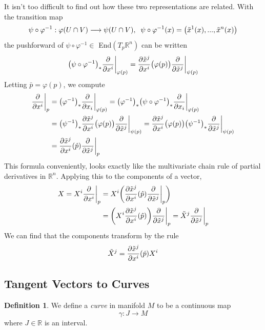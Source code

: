 \documentclass{article}
\theoremstyle{remark}
\theoremstyle{definition}
\newtheorem{definition}{Definition}[section]
\begin{document}
It isn't too difficult to find out how these two representations are related. With the transition map 
\[\psi \circ \varphi^{-1} : \varphi(U \cap V) \longrightarrow \psi (U \cap V), \;\; \psi \circ \varphi^{-1} (x) = \big( \Tilde{x}^1 (x), ..., \Tilde{x}^n (x) \big)\]
the pushforward of $\psi \circ \varphi^{-1} \in$ End$(T_p \mathbb{R}^n)$ can be written
\[\big( \psi \circ \varphi^{-1}\big)_* \frac{\partial}{\partial x^i} \bigg|_{\varphi(p)} = \frac{\partial \Tilde{x}^j}{\partial x^i} \big( \varphi(p) \big) \frac{\partial}{\partial \Tilde{x}^j} \bigg|_{\psi(p)}\]
Letting $\bar{p} = \varphi(p)$, we compute
\begin{align*}
    \frac{\partial}{\partial x^i} \bigg|_p & = \big( \varphi^{-1} \big)_* \frac{\partial}{\partial x_i} \bigg|_{\varphi(p)} = \big( \varphi^{-1} \big)_* \big( \psi \circ \varphi^{-1} \big)_* \frac{\partial}{\partial x_i} \bigg|_{\varphi(p)} \\ 
    & = \big( \psi^{-1}\big)_* \frac{\partial \Tilde{x}^j}{\partial x^i} \big( \varphi(p)\big) \frac{\partial}{\partial \Tilde{x}^j} \bigg|_{\psi(p)} = \frac{\partial \Tilde{x}^j}{\partial x^i} \big( \varphi(p)\big) \big( \psi^{-1}\big)_* \frac{\partial}{\partial \Tilde{x}^j} \bigg|_{\psi (p)} \\
    & = \frac{\partial \Tilde{x}^j}{\partial x^i} (\hat{p}) \frac{\partial}{\partial \Tilde{x}^j} \bigg|_p
\end{align*}
This formula conveniently, looks exactly like the multivariate chain rule of partial derivatives in $\mathbb{R}^n$. Applying this to the components of a vector, 
\begin{align*}
X = X^i \frac{\partial}{\partial x^i} \bigg|_p & = X^i \bigg( \frac{\partial \Tilde{x}^j}{\partial x^i} (\hat{p}) \frac{\partial}{\partial \Tilde{x}^j} \bigg|_p \bigg) \\
& = \bigg(X^i \frac{\partial \Tilde{x}^j}{\partial x^i} (\hat{p}) \bigg) \frac{\partial}{\partial \Tilde{x}^j} \bigg|_p =
\Tilde{X}^j \frac{\partial}{\partial \Tilde{x}^j} \bigg|_p
\end{align*}
We can find that the components transform by the rule 
\[\Tilde{X}^j = \frac{\partial \Tilde{x}^j}{\partial x^i} (\hat{p}) X^i\]

\subsection{Tangent Vectors to Curves}
\begin{definition}
We define a \textit{curve} in manifold $M$ to be a continuous map 
\[\gamma: J \longrightarrow M\]
where $J \in \mathbb{R}$ is an interval. 
\end{definition}
\end{document}
